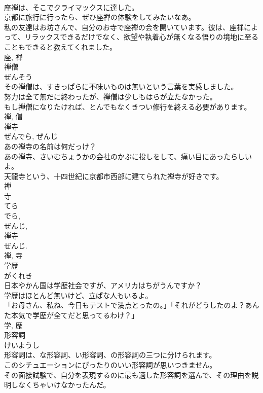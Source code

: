 \documentclass[8pt]{extreport}
\begin{document}
\begin{CJK}{UTF8}{min}
\\	座禅は、そこでクライマックスに達した。	
\\	京都に旅行に行ったら、ぜひ座禅の体験をしてみたいなあ。	
\\	私の友達はお坊さんで、自分のお寺で座禅の会を開いています。彼は、座禅によって、リラックスできるだけでなく、欲望や執着心が無くなる悟りの境地に至ることもできると教えてくれました。	
\\	座, 禅	
\\	禅僧	
\\	ぜんそう	
\\	その禅僧は、すきっぱらに不味いものは無いという言葉を実感しました。	
\\	努力は全て無だに終わったが、禅僧は少しもはらが立たなかった。	
\\	もし禅僧になりたければ、とんでもなくきつい修行を終える必要があります。	
\\	禅, 僧	
\\	禅寺	
\\	ぜんでら, ぜんじ	
\\	あの禅寺の名前は何だっけ？	
\\	あの禅寺、さいむちょうかの会社のかぶに投しをして、痛い目にあったらしいよ。	
\\	天龍寺という、十四世紀に京都市西部に建てられた禅寺が好きです。	
\\	禅 
\\	寺 
\\	てら 
\\	でら, 
\\	ぜんじ, 
\\	禅寺 
\\	ぜんじ. 
\\	禅, 寺	
\\	学歴	
\\	がくれき	
\\	日本やかん国は学歴社会ですが、アメリカはちがうんですか？	
\\	学歴はほとんど無いけど、立ぱな人もいるよ。	
\\	「お母さん、私ね、今日もテストで満点とったの。」「それがどうしたのよ？あんた本気で学歴が全てだと思ってるわけ？」	
\\	学, 歴	
\\	形容詞	
\\	けいようし	
\\	形容詞は、な形容詞、い形容詞、の形容詞の三つに分けられます。	
\\	このシチュエーションにぴったりのいい形容詞が思いつきません。	
\\	その面接試験で、自分を表現するのに最も適した形容詞を選んで、その理由を説明しなくちゃいけなかったんだ。	

\end{CJK}
\end{document}
